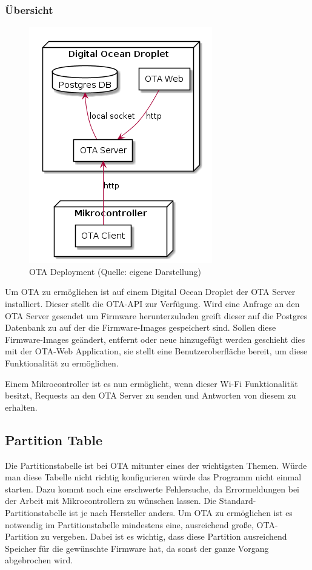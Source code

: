 \subsubsection{Übersicht}
\begin{figure}[H]
    \begin{center}
        \includegraphics[scale=0.6]{diagrams/ota_deployment.png}
        \caption{OTA Deployment (Quelle: eigene Darstellung)}
    \end{center}
\end{figure}
Um OTA zu ermöglichen ist auf einem Digital Ocean Droplet der OTA Server installiert. Dieser stellt die OTA-API zur Verfügung. Wird eine Anfrage an den OTA Server gesendet um Firmware herunterzuladen greift dieser auf die Postgres Datenbank zu auf der die Firmware-Images gespeichert sind. Sollen diese Firmware-Images geändert, entfernt oder neue hinzugefügt werden geschieht dies mit der OTA-Web Application, sie stellt eine Benutzeroberfläche bereit, um diese Funktionalität zu ermöglichen.

Einem Mikrocontroller ist es nun ermöglicht, wenn dieser Wi-Fi Funktionalität besitzt, Requests an den OTA Server zu senden und Antworten von diesem zu erhalten.

\subsection{Partition Table}\label{sec:ota-partition-table}
Die Partitionstabelle ist bei OTA mitunter eines der wichtigsten Themen. Würde man diese Tabelle nicht richtig konfigurieren würde das Programm nicht einmal starten. Dazu kommt noch eine erschwerte Fehlersuche, da Errormeldungen bei der Arbeit mit Mikrocontrollern zu wünschen lassen.
Die Standard-Partitionstabelle ist je nach Hersteller anders. Um OTA zu ermöglichen ist es notwendig im Partitionstabelle mindestens eine, ausreichend große, OTA-Partition zu vergeben. Dabei ist es wichtig, dass diese Partition ausreichend Speicher für die gewünschte Firmware hat, da sonst der ganze Vorgang abgebrochen wird.

